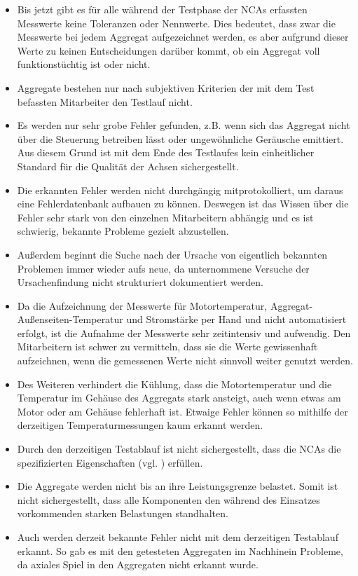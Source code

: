 \begin{itemize}
    \item Bis jetzt gibt es für alle während der Testphase der NCAs erfassten  Messwerte keine Toleranzen oder Nennwerte. Dies bedeutet, dass zwar die Messwerte bei jedem Aggregat aufgezeichnet werden, es aber aufgrund dieser Werte zu keinen Entscheidungen darüber kommt, ob ein Aggregat voll funktionstüchtig ist oder nicht. 
    \item Aggregate bestehen nur nach subjektiven Kriterien der mit dem Test befassten Mitarbeiter den Testlauf nicht.
    \item Es werden nur sehr grobe Fehler gefunden, z.B. wenn sich das Aggregat nicht über die Steuerung betreiben lässt oder ungewöhnliche Geräusche emittiert. Aus diesem Grund ist mit dem Ende des Testlaufes kein einheitlicher Standard für die Qualität der Achsen sichergestellt. 
    \item Die erkannten Fehler werden nicht durchgängig mitprotokolliert, um daraus eine Fehlerdatenbank aufbauen zu können. Deswegen ist das Wissen über die Fehler sehr stark von den einzelnen Mitarbeitern abhängig und es ist schwierig, bekannte Probleme gezielt abzustellen. 
    \item Außerdem beginnt die Suche nach der Ursache von eigentlich bekannten Problemen immer wieder aufs neue, da unternommene Versuche der Ursachenfindung nicht strukturiert dokumentiert werden.
    \item Da die Aufzeichnung der Messwerte für Motortemperatur, Aggregat-Außenseiten-Tem\-pe\-ra\-tur und Stromstärke per Hand und nicht automatisiert erfolgt, ist die Aufnahme der Messwerte sehr zeitintensiv und aufwendig. Den Mitarbeitern ist schwer zu vermitteln, dass sie die Werte gewissenhaft aufzeichnen, wenn die gemessenen Werte nicht sinnvoll weiter genutzt werden.
    \item Des Weiteren verhindert die Kühlung, dass die Motortemperatur und die Temperatur im Gehäuse des Aggregats stark ansteigt, auch wenn etwas am Motor oder am Gehäuse fehlerhaft ist. Etwaige Fehler können so mithilfe der derzeitigen Temperaturmessungen kaum erkannt werden.
    \item Durch den derzeitigen Testablauf ist nicht sichergestellt, dass die NCAs die spezifizierten Eigenschaften (vgl. \cite{VC_1_Betriebsanleitung2015}) erfüllen. 
    \item Die Aggregate werden nicht bis an ihre Leistungsgrenze belastet. Somit ist nicht sichergestellt, dass alle Komponenten den während des Einsatzes vorkommenden starken Belastungen standhalten.
    \item Auch werden derzeit bekannte Fehler nicht mit dem derzeitigen Testablauf erkannt. So gab es mit den getesteten Aggregaten im Nachhinein Probleme, da axiales Spiel in den Aggregaten nicht erkannt wurde.
\end{itemize}


